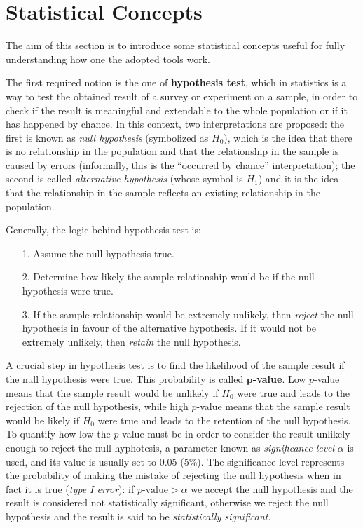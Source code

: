 \section{Statistical Concepts}
\label{section:statistical_concepts}
The aim of this section is to introduce some statistical concepts useful for fully understanding how one the adopted tools work.

The first required notion is the one of \textbf{hypothesis test}, which in statistics is a way to test the obtained result of a survey or experiment on a sample, in order to check if the result is meaningful and extendable to the whole population or if it has happened by chance. In this context, two interpretations are proposed: the first is known as \textit{null hypothesis} (symbolized as \(H_0\)), which is the idea that there is no relationship in the population and that the relationship in the sample is caused by errors (informally, this is the ``occurred by chance'' interpretation); the second is called \textit{alternative hypothesis} (whose symbol is \(H_1\)) and it is the idea that the relationship in the sample reflects an existing relationship in the population.

Generally, the logic behind hypothesis test is:
\begin{itemize}
\item[1.] Assume the null hypothesis true.
\item[2.] Determine how likely the sample relationship would be if the null hypothesis were true.
\item[3.] If the sample relationship would be extremely unlikely, then \textit{reject} the null hypothesis in favour of the alternative hypothesis. If it would not be extremely unlikely, then \textit{retain} the null hypothesis.
\end{itemize}

A crucial step in hypothesis test is to find the likelihood of the sample result if the null hypothesis were true. This probability is called \textbf{\(\bm{p}\)-value}. Low \(p\)-value means that the sample result would be unlikely if \(H_0\) were true and leads to the rejection of the null hypothesis, while high \(p\)-value means that the sample result would be likely if \(H_0\) were true and leads to the retention of the null hypothesis. To quantify how low the \(p\)-value must be in order to consider the result unlikely enough to reject the null hyphotesis, a parameter known as \textit{significance level} \(\alpha\) is used, and its value is usually set to 0.05 (5\%). The significance level represents the probability of making the mistake of rejecting the null hypothesis when in fact it is true (\textit{type I error}): if \(p\textrm{-value} > \alpha\) we accept the null hypothesis and the result is considered not statistically significant, otherwise we reject the null hypothesis and the result is said to be \textit{statistically significant}.

